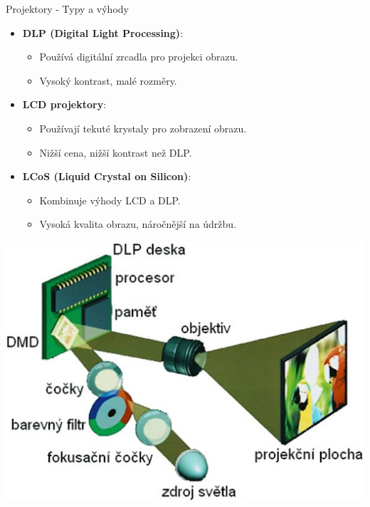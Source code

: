 \documentclass[aspectratio=43]{beamer}
\begin{document}
\begin{frame}{Projektory - Typy a výhody}
    \begin{itemize}
        \item \textbf{DLP (Digital Light Processing)}:
        \begin{itemize}
            \item Používá digitální zrcadla pro projekci obrazu.
            \item Vysoký kontrast, malé rozměry.
        \end{itemize}
        \item \textbf{LCD projektory}:
        \begin{itemize}
            \item Používají tekuté krystaly pro zobrazení obrazu.
            \item Nižší cena, nižší kontrast než DLP.
        \end{itemize}
        \item \textbf{LCoS (Liquid Crystal on Silicon)}:
        \begin{itemize}
            \item Kombinuje výhody LCD a DLP.
            \item Vysoká kvalita obrazu, náročnější na údržbu.
        \end{itemize}
    \end{itemize}
\end{frame}

\begin{frame}{}
    \begin{center}
        \includegraphics[width=0.85\linewidth]{extrahovane_obrazky/dlp.jpg}
    \end{center}
\end{frame}
\end{document}
